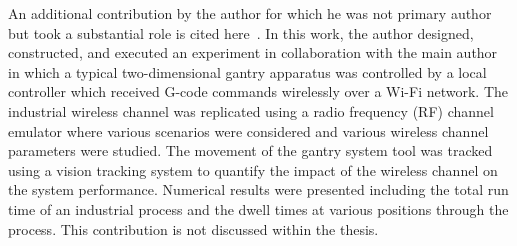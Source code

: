 \documentclass[twocolumn]{IEEEtran}
\begin{document}
		An additional contribution by the author for which he was not primary author but took a substantial role is cited here~\cite{MSEC2019-2896}.  In this work, the author designed, constructed, and executed an experiment in collaboration with the main author in which a typical two-dimensional gantry apparatus was controlled by a local controller which received G-code commands wirelessly over a Wi-Fi network. The industrial wireless channel was replicated using a radio frequency (RF) channel emulator where various scenarios were considered and various wireless channel parameters were studied. The movement of the gantry system tool was tracked using a vision tracking system to quantify the impact of the wireless channel on the system performance. Numerical results were presented including the total run time of an industrial process and the dwell times at various positions through the process. This contribution is not discussed within the thesis.
	
		
%		
%		
%		
		
		
	


				
		 

	
	



	
\end{document}
